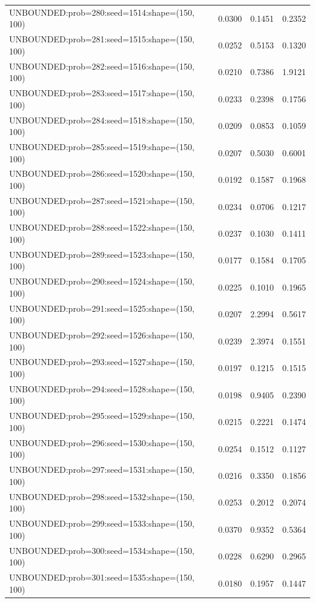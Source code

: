 \begin{longtable}{lccc}
UNBOUNDED:prob=280:seed=1514:shape=(150, 100) &   0.0300 &  0.1451 &  0.2352 \\
UNBOUNDED:prob=281:seed=1515:shape=(150, 100) &   0.0252 &  0.5153 &  0.1320 \\
UNBOUNDED:prob=282:seed=1516:shape=(150, 100) &   0.0210 &  0.7386 &  1.9121 \\
UNBOUNDED:prob=283:seed=1517:shape=(150, 100) &   0.0233 &  0.2398 &  0.1756 \\
UNBOUNDED:prob=284:seed=1518:shape=(150, 100) &   0.0209 &  0.0853 &  0.1059 \\
UNBOUNDED:prob=285:seed=1519:shape=(150, 100) &   0.0207 &  0.5030 &  0.6001 \\
UNBOUNDED:prob=286:seed=1520:shape=(150, 100) &   0.0192 &  0.1587 &  0.1968 \\
UNBOUNDED:prob=287:seed=1521:shape=(150, 100) &   0.0234 &  0.0706 &  0.1217 \\
UNBOUNDED:prob=288:seed=1522:shape=(150, 100) &   0.0237 &  0.1030 &  0.1411 \\
UNBOUNDED:prob=289:seed=1523:shape=(150, 100) &   0.0177 &  0.1584 &  0.1705 \\
UNBOUNDED:prob=290:seed=1524:shape=(150, 100) &   0.0225 &  0.1010 &  0.1965 \\
UNBOUNDED:prob=291:seed=1525:shape=(150, 100) &   0.0207 &  2.2994 &  0.5617 \\
UNBOUNDED:prob=292:seed=1526:shape=(150, 100) &   0.0239 &  2.3974 &  0.1551 \\
UNBOUNDED:prob=293:seed=1527:shape=(150, 100) &   0.0197 &  0.1215 &  0.1515 \\
UNBOUNDED:prob=294:seed=1528:shape=(150, 100) &   0.0198 &  0.9405 &  0.2390 \\
UNBOUNDED:prob=295:seed=1529:shape=(150, 100) &   0.0215 &  0.2221 &  0.1474 \\
UNBOUNDED:prob=296:seed=1530:shape=(150, 100) &   0.0254 &  0.1512 &  0.1127 \\
UNBOUNDED:prob=297:seed=1531:shape=(150, 100) &   0.0216 &  0.3350 &  0.1856 \\
UNBOUNDED:prob=298:seed=1532:shape=(150, 100) &   0.0253 &  0.2012 &  0.2074 \\
UNBOUNDED:prob=299:seed=1533:shape=(150, 100) &   0.0370 &  0.9352 &  0.5364 \\
UNBOUNDED:prob=300:seed=1534:shape=(150, 100) &   0.0228 &  0.6290 &  0.2965 \\
UNBOUNDED:prob=301:seed=1535:shape=(150, 100) &   0.0180 &  0.1957 &  0.1447 \\

\end{longtable}
